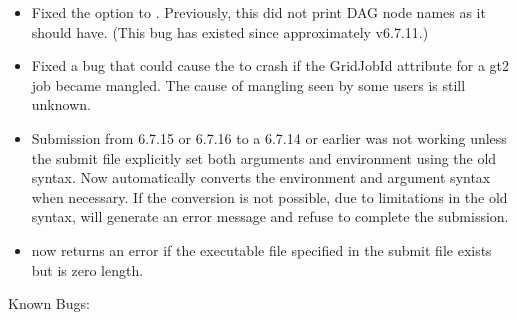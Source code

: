 \begin{itemize}
\item Fixed the  option to .  Previously, this did not
print DAG node names as it should have.  (This bug has existed since
approximately v6.7.11.)

\item Fixed a bug that could cause the  to crash
if the GridJobId attribute for a gt2 job became mangled. The cause of
mangling seen by some users is still unknown.

\item Submission from 6.7.15 or 6.7.16  to a 6.7.14 or
earlier  was not working unless the submit file
explicitly set both arguments and environment using the old syntax.
Now  automatically converts the environment and
argument syntax when necessary.  If the conversion is not possible,
due to limitations in the old syntax,  will generate
an error message and refuse to complete the submission.

\item {} now returns an error if the executable file
specified in the submit file exists but is zero length.

\end{itemize}

\noindent Known Bugs:

